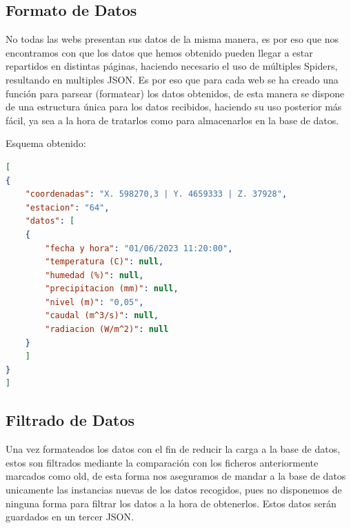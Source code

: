 \subsection{Formato de Datos}
No todas las webs presentan sus datos de la misma manera, es por eso que nos encontramos con que los datos que hemos obtenido pueden llegar a estar repartidos en distintas páginas, haciendo necesario el uso de múltiples Spiders, resultando en multiples JSON.\newline
\newline
Es por eso que para cada web se ha creado una función para parsear (formatear) los datos obtenidos, de esta manera se dispone de una estructura única para los datos recibidos, haciendo su uso posterior más fácil, ya sea a la hora de tratarlos como para almacenarlos en la base de datos.

Esquema obtenido:
\newline
\newline
\newline
\begin{lstlisting}[language=json]
[
{
	"coordenadas": "X. 598270,3 | Y. 4659333 | Z. 37928",
	"estacion": "64",
	"datos": [
	{
		"fecha y hora": "01/06/2023 11:20:00",
		"temperatura (C)": null,
		"humedad (%)": null,
		"precipitacion (mm)": null,
		"nivel (m)": "0,05",
		"caudal (m^3/s)": null,
		"radiacion (W/m^2)": null
	}
	]
}
]
\end{lstlisting}

\subsection{Filtrado de Datos}
Una vez formateados los datos con el fin de reducir la carga a la base de datos, estos son filtrados mediante la comparación con los ficheros anteriormente marcados como old, de esta forma nos aseguramos de mandar a la base de datos unicamente las instancias nuevas de los datos recogidos, pues no disponemos de ninguna forma para filtrar los datos a la hora de obtenerlos. Estos datos serán guardados en un tercer JSON.

